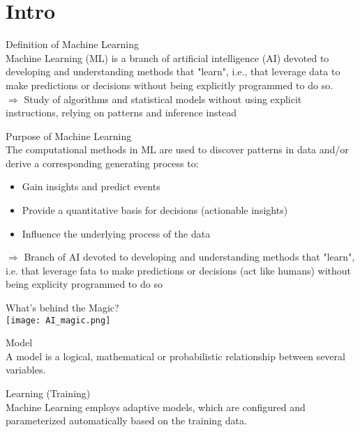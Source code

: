 \section{Intro}


\begin{definition}{Definition of Machine Learning}\\
    Machine Learning (ML) is a branch of artificial intelligence (AI) devoted to developing and understanding methods that "learn", i.e., that leverage data to make predictions or decisions without being explicitly programmed to do so.\\
    $\Rightarrow$ Study of algorithms and statistical models without using explicit instructions, relying on patterns and inference instead
\end{definition}

\begin{concept}{Purpose of Machine Learning}\\
The computational methods in ML are used to discover patterns in data and/or derive a corresponding generating process to:
\begin{itemize}
    \item Gain insights and predict events
    \item Provide a quantitative basis for decisions (actionable insights)
    \item Influence the underlying process of the data
\end{itemize}
$\Rightarrow$ Branch of AI devoted to developing and understanding methods that "learn", i.e. that leverage fata to make predictions or decisions (act like humans) without being explicity programmed to do so
\end{concept}

\begin{definition}{What's behind the Magic?} \\
    \texttt{[image: AI\_magic.png]}
\end{definition}

\begin{definition}{Model}\\
A model is a logical, mathematical or probabilistic relationship between several variables.
\end{definition}

\begin{definition}{Learning (Training)}\\
Machine Learning employs adaptive models, which are configured and parameterized automatically based on the training data.
\end{definition}

